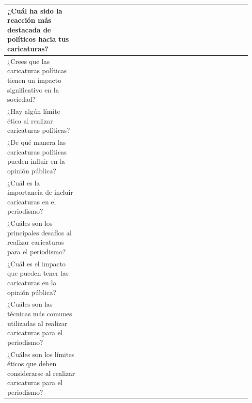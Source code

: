 \documentclass[12pt,a4paper]{article}
\begin{document}
\begin{landscape}
\begin{table}[ht!]
\begin{tabular}{llllllllllllllllllllllllll}
			¿Cuál ha sido la reacción más destacada de políticos hacia tus caricaturas?                            &                                          &    &    &    &    &    &    &    &    &     &     &     &     &     &     &     &     &     &     &     &           \\\hline
			¿Crees que las caricaturas políticas tienen un impacto significativo en la sociedad?                   &                                          &    &    &    &    &    &    &    &    &     &     &     &     &     &     &     &     &     &     &     &           \\\hline
			¿Hay algún límite ético al realizar caricaturas políticas?                                             &                                          &    &    &    &    &    &    &    &    &     &     &     &     &     &     &     &     &     &     &     &           \\\hline
			¿De qué manera las caricaturas políticas pueden influir en la opinión pública?                         &                                          &    &    &    &    &    &    &    &    &     &     &     &     &     &     &     &     &     &     &     &           \\\hline
			¿Cuál es la importancia de incluir caricaturas en el periodismo?                                       &                                          &    &    &    &    &    &    &    &    &     &     &     &     &     &     &     &     &     &     &     &           \\\hline
			¿Cuáles son los principales desafíos al realizar caricaturas para el periodismo?                       &                                          &    &    &    &    &    &    &    &    &     &     &     &     &     &     &     &     &     &     &     &           \\\hline
			¿Cuál es el impacto que pueden tener las caricaturas en la opinión pública?                            &                                          &    &    &    &    &    &    &    &    &     &     &     &     &     &     &     &     &     &     &     &           \\\hline
			¿Cuáles son las técnicas más comunes utilizadas al realizar caricaturas para el periodismo?            &                                          &    &    &    &    &    &    &    &    &     &     &     &     &     &     &     &     &     &     &     &           \\\hline
			¿Cuáles son los límites éticos que deben considerarse al realizar caricaturas para el periodismo?      &                                          &    &    &    &    &    &    &    &    &     &     &     &     &     &     &     &     &     &     &     &           \\\hline

\end{tabular}
\end{table}
\end{landscape}
\end{document}
